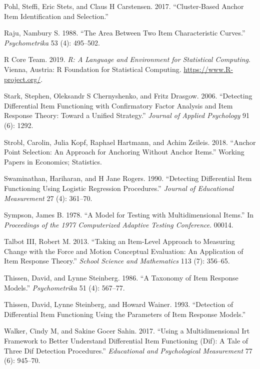 \documentclass[
  11pt,
]{article}
\begin{document}
\leavevmode\hypertarget{ref-pohl2017cluster}{}%
Pohl, Steffi, Eric Stets, and Claus H Carstensen. 2017. ``Cluster-Based Anchor Item Identification and Selection.''

\leavevmode\hypertarget{ref-raju1988area}{}%
Raju, Nambury S. 1988. ``The Area Between Two Item Characteristic Curves.'' \emph{Psychometrika} 53 (4): 495--502.

\leavevmode\hypertarget{ref-rcore}{}%
R Core Team. 2019. \emph{R: A Language and Environment for Statistical Computing}. Vienna, Austria: R Foundation for Statistical Computing. \url{https://www.R-project.org/}.

\leavevmode\hypertarget{ref-stark2006detecting}{}%
Stark, Stephen, Oleksandr S Chernyshenko, and Fritz Drasgow. 2006. ``Detecting Differential Item Functioning with Confirmatory Factor Analysis and Item Response Theory: Toward a Unified Strategy.'' \emph{Journal of Applied Psychology} 91 (6): 1292.

\leavevmode\hypertarget{ref-strobl2018anchor}{}%
Strobl, Carolin, Julia Kopf, Raphael Hartmann, and Achim Zeileis. 2018. ``Anchor Point Selection: An Approach for Anchoring Without Anchor Items.'' Working Papers in Economics; Statistics.

\leavevmode\hypertarget{ref-swaminathan1990detecting}{}%
Swaminathan, Hariharan, and H Jane Rogers. 1990. ``Detecting Differential Item Functioning Using Logistic Regression Procedures.'' \emph{Journal of Educational Measurement} 27 (4): 361--70.

\leavevmode\hypertarget{ref-sympson1978model}{}%
Sympson, James B. 1978. ``A Model for Testing with Multidimensional Items.'' In \emph{Proceedings of the 1977 Computerized Adaptive Testing Conference}. 00014.

\leavevmode\hypertarget{ref-talbot2013taking}{}%
Talbot III, Robert M. 2013. ``Taking an Item-Level Approach to Measuring Change with the Force and Motion Conceptual Evaluation: An Application of Item Response Theory.'' \emph{School Science and Mathematics} 113 (7): 356--65.

\leavevmode\hypertarget{ref-thissen1986taxonomy}{}%
Thissen, David, and Lynne Steinberg. 1986. ``A Taxonomy of Item Response Models.'' \emph{Psychometrika} 51 (4): 567--77.

\leavevmode\hypertarget{ref-thissen1993detection}{}%
Thissen, David, Lynne Steinberg, and Howard Wainer. 1993. ``Detection of Differential Item Functioning Using the Parameters of Item Response Models.''

\leavevmode\hypertarget{ref-walker2017using}{}%
Walker, Cindy M, and Sakine Gocer Sahin. 2017. ``Using a Multidimensional Irt Framework to Better Understand Differential Item Functioning (Dif): A Tale of Three Dif Detection Procedures.'' \emph{Educational and Psychological Measurement} 77 (6): 945--70.
\end{document}

